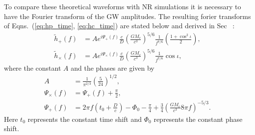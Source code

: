 \documentclass{ucdgradtaughtthesis}
\begin{document}
To compare these theoretical waveforms with NR simulations it is necessary to have the
Fourier transform of the GW amplitudes. The resulting forier transforms of Eqns.~(\ref{eq:hp_time}, \ref{eq:hc_time})
are stated below and derived in Sec~\cite[Sec.~4.1]{GRbook} :
\begin{subequations}
    \label{eq:hfreq}
    \begin{align}
        \tilde{h}_+(f) &= A e^{i \Psi_+(f)} \frac{c}{D} \left( \frac{G M_c}{c^3} \right)^{5/6} \frac{1}{f^{7/6}} \left( \frac{1 + \cos^2 \iota}{2} \right), \label{eq:hplus_freq} \\
        \tilde{h}_\times(f) &= A e^{i \Psi_\times(f)} \frac{c}{D} \left( \frac{G M_c}{c^3} \right)^{5/6} \frac{1}{f^{7/6}} \cos \iota, \label{eq:hcross_freq}
    \end{align}
\end{subequations}
%
%
where the constant \( A \) and the phases are given by
\begin{subequations}
    \begin{align}
        A &= \frac{1}{\pi^{2/3}} \left( \frac{5}{24} \right)^{1/2}, \label{eq:A_amp} \\
        \Psi_\times(f) &= \Psi_+(f) + \frac{\pi}{2}, \label{eq:psi_cross} \\
        \Psi_+(f) &= 2\pi f \left( t_0 + \frac{D}{c} \right) - \Phi_0 - \frac{\pi}{4} + \frac{3}{4} \left( \frac{G M_c}{c^3} 8\pi f \right)^{-5/3}. \label{eq:psi_plus}
    \end{align}
\end{subequations}
%
Here \( t_0 \) represents the constant time shift and \( \Phi_0 \) represents the constant phase shift.
%
\end{document}
